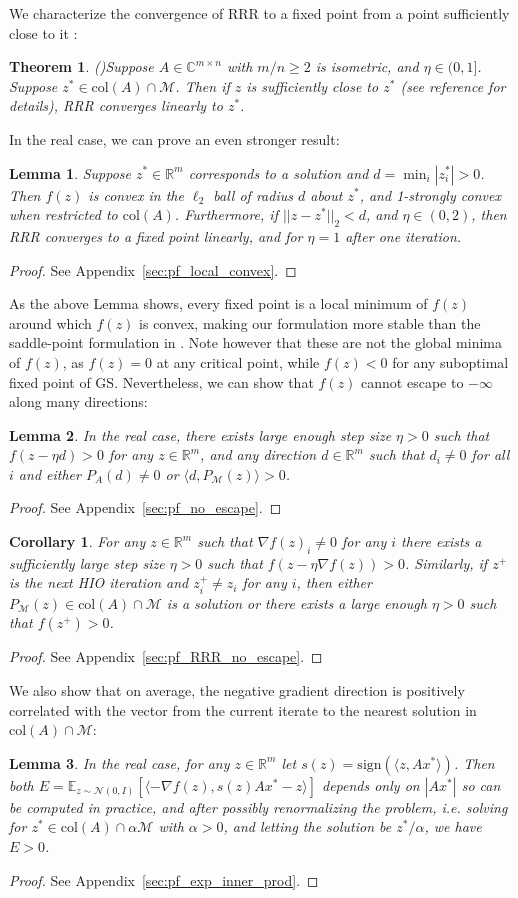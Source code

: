 \documentclass[12pt]{article}
\newtheorem{theorem}{Theorem}
\newtheorem{lemma}{Lemma}
\newtheorem{corollary}{Corollary}
\theoremstyle{definition}
\theoremstyle{remark}
\theoremstyle{definition}
\theoremstyle{problem}
\theoremstyle{definition}
\newcommand{\bthm}{\begin{theorem}}
\newcommand{\ethm}{\end{theorem}}
\newcommand{\blem}{\begin{lemma}}
\newcommand{\elem}{\end{lemma}}
\newcommand{\bpof}{\begin{proof}}
\newcommand{\epof}{\end{proof}}
\newcommand{\bcor}{\begin{corollary}}
\newcommand{\ecor}{\end{corollary}}
\newcommand{\col}{\text{col}}
\newcommand{\sign}{\text{sign}}
\newcommand{\RR}{\mathbb{R} }
\newcommand{\CC}{\mathbb{C}}
\newcommand{\MM}{\mathcal{M}}
\newcommand{\EE}{\mathbb{E}}
\newcommand{\TODO}[1]{{\color{red}{[#1]}}}
\begin{document}
We characterize the convergence of RRR to a fixed point from a point sufficiently close to it \TODO{in its basin of attraction?}:
\bthm\emph{(\cite[Thm. 3]{Li2017a})}\label{lem:lin_conver} Suppose $A\in\CC^{m\times n}$ with $m/n\geq 2$ is isometric, and $\eta\in(0,1]$. Suppose $z^*\in\col(A)\cap\MM$. Then if $z$ is sufficiently close to $z^*$ (see reference for details), RRR converges linearly to $z^*$. \ethm

In the real case, we can prove an even stronger result:
\blem\label{lem:local_convex} Suppose $z^*\in\RR^m$ corresponds to a solution and $d = \min_i|z^*_i| > 0$. Then $f(z)$ is convex in the $\ell_2$ ball of radius $d$ about $z^*$, and 1-strongly convex when restricted to $\col(A)$. Furthermore, if $||z-z^*||_2<d$, and $\eta\in(0,2)$, then RRR converges to a fixed point linearly, and for $\eta=1$ after one iteration. \elem
\bpof See Appendix~\ref{sec:pf_local_convex}. \epof

As the above Lemma shows, every fixed point is a local minimum of $f(z)$ around which $f(z)$ is convex, making our formulation more stable than the saddle-point formulation in \cite{Marchesini2007}. Note however that these are not the global minima of $f(z)$, as $f(z)=0$ at any critical point, while $f(z)<0$ for any suboptimal fixed point of GS. Nevertheless, we can show that $f(z)$ cannot escape to $-\infty$ along many directions:

\blem\label{lem:no_escape} In the real case, there exists large enough step size $\eta>0$ such that $f(z-\eta d) > 0$ for any $z\in\RR^m$, and any direction $d\in\RR^m$ such that $d_i\neq 0$ for all $i$ and either $P_A(d)\neq 0$ or $\langle d, P_{\MM}(z)\rangle > 0$. \elem
\bpof See Appendix~\ref{sec:pf_no_escape}. \epof

\bcor\label{cor:RRR_no_escape} For any $z\in\RR^m$ such that $\nabla f(z)_i\neq 0$ for any $i$ there exists a sufficiently large step size $\eta>0$ such that $f(z-\eta\nabla f(z)) > 0$. Similarly, if $z^+$ is the next HIO iteration and $z^+_i\neq z_i$ for any $i$, then either $P_{\MM}(z)\in\col(A)\cap\MM$ is a solution or there exists a large enough $\eta>0$ such that $f(z^+)>0$. \ecor
\bpof See Appendix~\ref{sec:pf_RRR_no_escape}. \epof

We also show that on average, the negative gradient direction is positively correlated with the vector from the current iterate to the nearest solution in $\col(A)\cap\MM$:
\blem\label{lem:exp_inner_prod} In the real case, for any $z\in\RR^m$ let $s(z) = \sign\left(\langle z, Ax^*\rangle\right)$. Then both $E = \EE_{z\sim\mathcal{N}(0, I)}\left[\langle -\nabla f(z), s(z)Ax^*-z\rangle\right]$ depends only on $|Ax^*|$ so can be computed in practice, and after possibly renormalizing the problem, i.e. solving for $z^*\in\col(A)\cap\alpha\MM$ with $\alpha>0$, and letting the solution be $z^*/\alpha$, we have $E>0$. \elem
\bpof See Appendix~\ref{sec:pf_exp_inner_prod}. \epof
\end{document}

